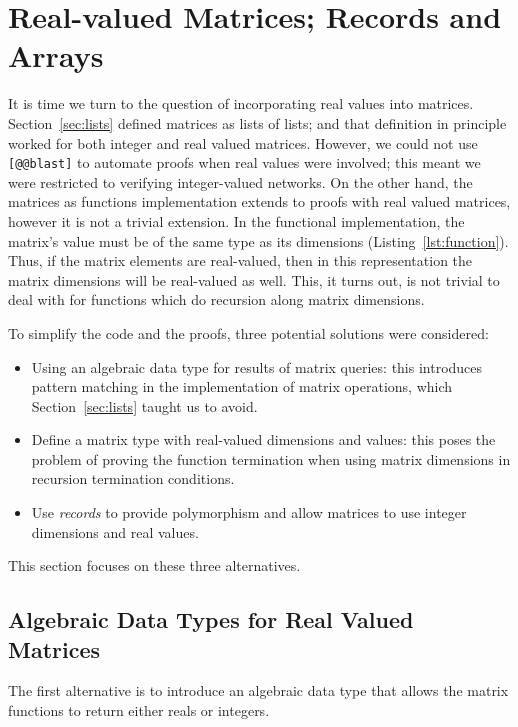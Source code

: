 \documentclass[runningheads]{llncs}
\newcommand{\knote}[1]{\todo[inline, color=blue!20]{#1}}
\begin{document}
\section{Real-valued Matrices; Records  and Arrays}\label{sec:records}

It is time we turn to the question of incorporating real values into matrices.
Section~\ref{sec:lists} defined matrices as lists of lists; and that definition
in principle worked for both integer and real valued matrices. However, we could
not use \lstinline{[@@blast]} to automate proofs when real values were involved;
this meant we were restricted to verifying integer-valued networks. On the
other hand, the matrices as functions implementation extends to proofs with real
valued matrices, however it is not a trivial extension. In the functional
implementation, the matrix's value must be of
the same type as its dimensions (Listing~\ref{lst:function}). Thus, if the matrix elements are real-valued, then
in this representation the matrix dimensions will be real-valued as well. This,
it turns out, is not trivial to deal with for functions which do recursion along
matrix dimensions.


To simplify the code and the proofs, three potential solutions were considered:
\begin{itemize}
	\item Using an algebraic data type for results of matrix queries: this introduces pattern matching in the implementation of matrix operations, which Section~\ref{sec:lists} taught us to avoid.
	\item Define a matrix type with real-valued dimensions and values: this poses the problem of proving the function termination when using matrix dimensions in recursion termination conditions.
	\item Use \emph{records} to provide polymorphism and allow matrices to use integer dimensions and real values.
\end{itemize}

This section focuses on these three alternatives.

\subsection{Algebraic Data Types for  Real Valued Matrices}

The first alternative is to introduce an algebraic data type that allows the matrix functions to return either reals or integers. 
\end{document}
